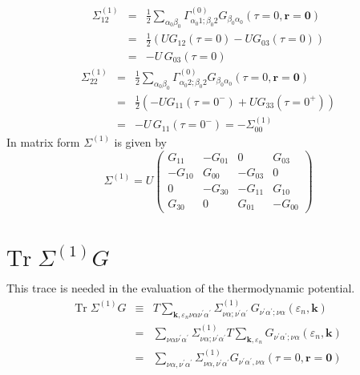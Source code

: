 \begin{eqnarray}
\Sigma^{(1)}_{12} & = &
\frac{1}{2}\sum_{\alpha_0\beta_0} \Gamma^{(0)}_{\alpha_0 1; \beta_0 2}
G_{\beta_0 \alpha_0}(\tau =0, \mathbf{r}=\mathbf{0}) \\
    & = & \frac{1}{2}\left(U G_{12}(\tau = 0) 
- U G_{03}(\tau = 0)\right) \\
    & = & -U\, G_{03}(\tau = 0)
\end{eqnarray}
\begin{eqnarray}
\Sigma^{(1)}_{22} & = &
\frac{1}{2}\sum_{\alpha_0\beta_0} \Gamma^{(0)}_{\alpha_0 2; \beta_0 2}
G_{\beta_0 \alpha_0}(\tau =0, \mathbf{r}=\mathbf{0}) \\
    & = & \frac{1}{2}\left(-U G_{11}(\tau = 0^-) + 
U G_{33}(\tau = 0^+)\right) \\
    & = & -U\, G_{11}(\tau = 0^-) = -\Sigma^{(1)}_{00} 
\end{eqnarray}
In matrix form $\Sigma^{(1)}$ is given by
\begin{equation}
\Sigma^{(1)} = 
U 
\begin{pmatrix}
G_{11} & -G_{01} & 0 & G_{03} \\
-G_{10} & G_{00} & -G_{03} & 0 \\
0  & -G_{30} & -G_{11} & G_{10} \\
G_{30} & 0 & G_{01} & -G_{00}
\end{pmatrix}
\end{equation}

\section{$\mathrm{Tr}\; \Sigma^{(1)} G$}

This trace is needed in the evaluation of the thermodynamic
potential.  
\begin{eqnarray}
\mathrm{Tr}\; \Sigma^{(1)} G & \equiv &
   T \sum_{\mathbf{k},\varepsilon_n\nu\alpha\nu^{\prime}\alpha^{\prime}}
  \Sigma^{(1)}_{\nu\alpha;\nu^{\prime}\alpha^{\prime}}\, 
G_{\nu^{\prime}\alpha^{\prime};\nu\alpha}(\varepsilon_n,\mathbf{k})
\\
& = & \sum_{\nu\alpha\nu^{\prime}\alpha^{\prime}} 
\Sigma^{(1)}_{\nu\alpha;\nu^{\prime}\alpha^{\prime}} T \sum_{\mathbf{k},\varepsilon_n} 
G_{\nu^{\prime}\alpha^{\prime};\nu\alpha}(\varepsilon_n,\mathbf{k}) \\
& = & 
\sum_{\nu\alpha,\nu^{\prime}\alpha^{\prime}}
\Sigma^{(1)}_{\nu\alpha,\nu^{\prime}\alpha^{\prime}}
G_{\nu^{\prime}\alpha^{\prime},\nu\alpha}(\tau=0,\mathbf{r}=\mathbf{0})
\end{eqnarray}


